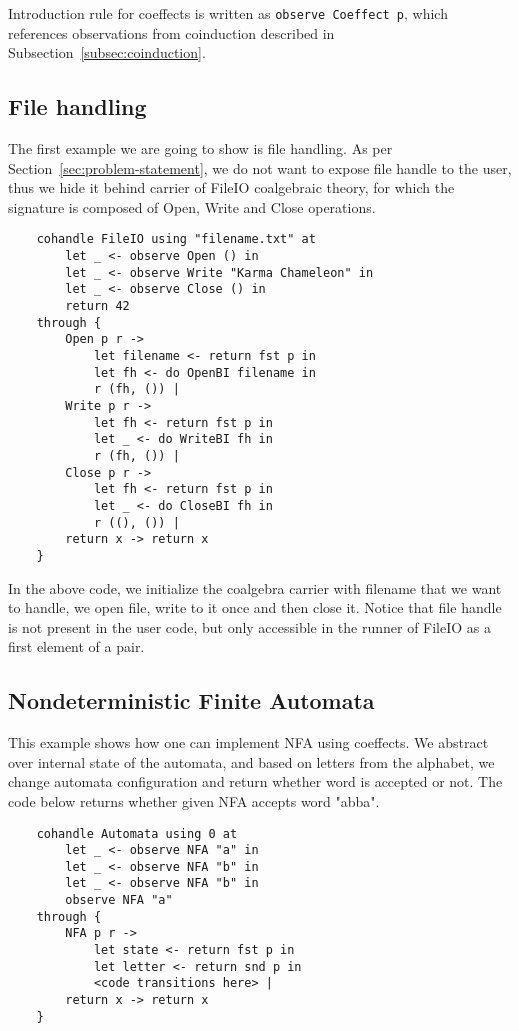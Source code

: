 \documentclass[declaration,shortabstract]{iithesis}
\theoremstyle{definition} \newtheorem{definition}{Definition}[chapter]
\theoremstyle{remark} \newtheorem{remark}[definition]{Observation}
\theoremstyle{plain} \newtheorem{theorem}[definition]{Theorem}
\theoremstyle{plain} \newtheorem{lemma}[definition]{Lemma}
\begin{document}
    Introduction rule for coeffects is written as \verb!observe Coeffect p!,
    which references observations from coinduction described in
    Subsection~\ref{subsec:coinduction}.

    \subsection{File handling}

    The first example we are going to show is file handling. As per
    Section~\ref{sec:problem-statement}, we do not want to expose file handle
    to the user, thus we hide it behind carrier of FileIO coalgebraic theory,
    for which the signature is composed of Open, Write and Close operations.

\begin{verbatim}
    cohandle FileIO using "filename.txt" at
        let _ <- observe Open () in
        let _ <- observe Write "Karma Chameleon" in
        let _ <- observe Close () in
        return 42
    through {
        Open p r ->
            let filename <- return fst p in
            let fh <- do OpenBI filename in
            r (fh, ()) |
        Write p r ->
            let fh <- return fst p in
            let _ <- do WriteBI fh in
            r (fh, ()) |
        Close p r ->
            let fh <- return fst p in
            let _ <- do CloseBI fh in
            r ((), ()) |
        return x -> return x
    }
\end{verbatim}

    In the above code, we initialize the coalgebra carrier with filename that
    we want to handle, we open file, write to it once and then close it. Notice
    that file handle is not present in the user code, but only accessible in
    the runner of FileIO as a first element of a pair.

    \subsection{Nondeterministic Finite Automata}

    This example shows how one can implement NFA using coeffects. We abstract
    over internal state of the automata, and based on letters from the alphabet,
    we change automata configuration and return whether word is accepted or not.
    The code below returns whether given NFA accepts word "abba".

\begin{verbatim}
    cohandle Automata using 0 at
        let _ <- observe NFA "a" in
        let _ <- observe NFA "b" in
        let _ <- observe NFA "b" in
        observe NFA "a"
    through {
        NFA p r ->
            let state <- return fst p in
            let letter <- return snd p in
            <code transitions here> |
        return x -> return x
    }
\end{verbatim}
\end{document}
